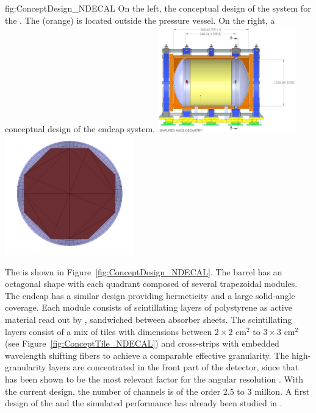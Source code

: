 \begin{dunefigure}{fig:ConceptDesign_NDECAL}
{On the left, the conceptual design of the  system for the . The  (orange) is located outside the  pressure vessel. On the right, a conceptual design of the  endcap system.}
\includegraphics[width=0.45\textwidth]{graphics/MPDdrawing.jpg}
\includegraphics[width=0.42\textwidth]{graphics/ECAL_Endcap_System.png}
\end{dunefigure}
The  is shown in Figure~\ref{fig:ConceptDesign_NDECAL}.  The barrel has an octagonal shape with each quadrant composed of several trapezoidal modules. The  endcap has a similar design providing hermeticity and a large solid-angle coverage. Each module consists of scintillating layers of polystyrene as active material read out by , sandwiched between absorber sheets. The scintillating layers consist of a mix of tiles with dimensions between $2\times2$ cm$^2$ to $3\times3$ cm$^2$ (see Figure~\ref{fig:ConceptTile_NDECAL}) and cross-strips with embedded wavelength shifting fibers to achieve a comparable effective granularity. The high-granularity layers are concentrated in the front part of the detector, since that has been shown to be the most relevant factor for the angular resolution \cite{Emberger:2018pgr}. With the current design, the number of channels is of the order 2.5 to 3 million. A first design of the  and the simulated performance has already been studied in \cite{Emberger:2018pgr}.


